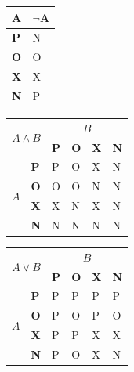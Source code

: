 \documentclass[a4paper, 11pt]{article}
\begin{document}
\begin{table}[h]
\centering
\begin{tabular}{|l|l|}
\hline
A          & $\neg$A                      \\ \hline
\textbf{P} & N                      \\ \hline
\textbf{O} & O                      \\ \hline
\textbf{X} & X                      \\ \hline
\textbf{N} & P                      \\ \hline
\end{tabular}
\begin{tabular}{|l|l|l|l|l|l|}
\hline
\multicolumn{2}{|c|}{\multirow{2}{*}{$A \wedge B$}} & \multicolumn{4}{c|}{$B$}                            \\ \cline{3-6} 
\multicolumn{2}{|c|}{}                       & \textbf{P} & \textbf{O} & \textbf{X} & \textbf{N} \\ \hline
\multirow{4}{*}{$A$}        & \textbf{P}       & P          & O          & X          & N          \\ \cline{2-6} 
                          & \textbf{O}       & O          & O          & N          & N          \\ \cline{2-6} 
                          & \textbf{X}       & X          & N          & X          & N          \\ \cline{2-6} 
                          & \textbf{N}       & N          & N          & N          & N          \\ \hline
\end{tabular}
\begin{tabular}{|l|l|l|l|l|l|}
\hline
\multicolumn{2}{|c|}{\multirow{2}{*}{$A \vee B$}} & \multicolumn{4}{c|}{$B$}                            \\ \cline{3-6} 
\multicolumn{2}{|c|}{}                       & \textbf{P} & \textbf{O} & \textbf{X} & \textbf{N} \\ \hline
\multirow{4}{*}{$A$}        & \textbf{P}       & P          & P          & P          & P          \\ \cline{2-6} 
                          & \textbf{O}       & P          & O          & P          & O          \\ \cline{2-6} 
                          & \textbf{X}       & P          & P          & X          & X          \\ \cline{2-6} 
                          & \textbf{N}       & P          & O          & X          & N          \\ \hline

\end{tabular}
\end{table}
\end{document}
